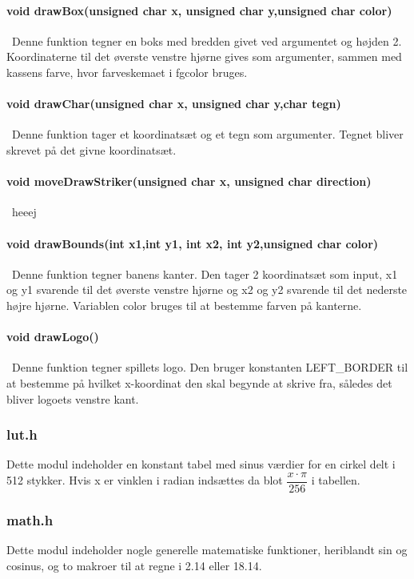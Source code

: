 \paragraph{
void drawBox(unsigned char x, unsigned char y,unsigned char color)}\
Denne funktion tegner en boks med bredden givet ved argumentet og højden 2. Koordinaterne til det øverste venstre hjørne gives som argumenter, sammen med kassens farve, hvor farveskemaet i fgcolor bruges.

\paragraph{void drawChar(unsigned char x, unsigned char y,char tegn)}\
Denne funktion tager et koordinatsæt og et tegn som argumenter. Tegnet bliver skrevet på det givne koordinatsæt.

\paragraph{void moveDrawStriker(unsigned char x, unsigned char direction)}\
heeej

\paragraph{void drawBounds(int x1,int y1, int x2, int y2,unsigned char color)}\
Denne funktion tegner banens kanter. Den tager 2 koordinatsæt som input, x1 og y1 svarende til det øverste venstre hjørne og  x2 og y2 svarende til det nederste højre hjørne. Variablen color bruges til at bestemme farven på kanterne. 

\paragraph{void drawLogo()}\
Denne funktion tegner spillets logo. Den bruger konstanten LEFT\_BORDER til at bestemme på hvilket x-koordinat den skal begynde at skrive fra, således det bliver logoets venstre kant.
\subsubsection{lut.h}
\label{lut}
Dette modul indeholder en konstant tabel med sinus værdier for en cirkel delt i 512 stykker. Hvis x er vinklen i radian indsættes da blot $\dfrac{x\cdot \pi}{256}$ i tabellen.
\subsubsection{math.h}
Dette modul indeholder nogle generelle matematiske funktioner, heriblandt sin og cosinus, og to makroer til at regne i 2.14 eller 18.14.
